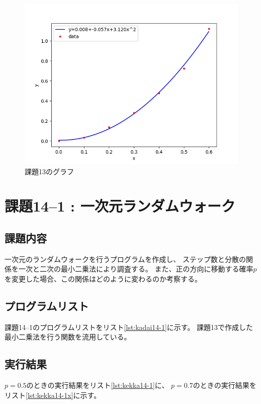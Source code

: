 \documentclass[a4j,titlepage]{jsarticle}
\begin{document}
\begin{figure}[H]
  \centering
  \includegraphics[width=13cm]{kadai13.png}
  \caption{課題13のグラフ}
  \label{graph11-2}
\end{figure}


\section{課題14--1 : 一次元ランダムウォーク}
\subsection{課題内容}
一次元のランダムウォークを行うプログラムを作成し、
ステップ数と分散の関係を一次と二次の最小二乗法により調査する。
また、正の方向に移動する確率$p$を変更した場合、この関係はどのように変わるのか考察する。

\subsection{プログラムリスト}
課題14--1のプログラムリストをリスト\ref{lst:kadai14-1}に示す。
課題13で作成した最小二乗法を行う関数を流用している。



\subsection{実行結果}
$p = 0.5$のときの実行結果をリスト\ref{lst:kekka14-1}に、
$p = 0.7$のときの実行結果をリスト\ref{lst:kekka14-1x}に示す。
\end{document}
